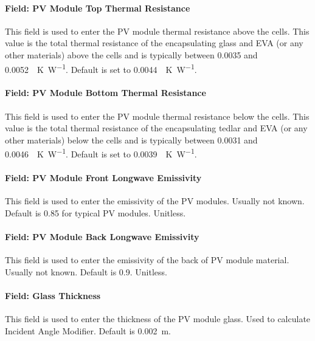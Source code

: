 \paragraph{Field: PV Module Top Thermal Resistance}\label{BIPVT-field-PVmodule-resistance-top}

This field is used to enter the PV module thermal resistance above the cells. This value is the total thermal resistance of the encapsulating glass and EVA (or any other materials) above the cells and is typically between 0.0035 and \SI{0.0052}{\area\K\per\watt}. Default is set to \SI{0.0044}{\area\K\per\watt}.


\paragraph{Field: PV Module Bottom Thermal Resistance}\label{BIPVT-field-PVmodule-resistance-bottom}

This field is used to enter the PV module thermal resistance below the cells. This value is the total thermal resistance of the encapsulating tedlar and EVA (or any other materials) below the cells and is typically between 0.0031 and \SI{0.0046}{\area\K\per\watt}. Default is set to \SI{0.0039}{\area\K\per\watt}.

\paragraph{Field: PV Module Front Longwave Emissivity}\label{BIPVT-field-PVmodule-emissivity}

This field is used to enter the emissivity of the PV modules. Usually not known. Default is 0.85 for typical PV modules. Unitless.

\paragraph{Field: PV Module Back Longwave Emissivity}\label{BIPVT-field-moduleBack-emissivity}

This field is used to enter the emissivity of the back of PV module material. Usually not known. Default is 0.9. Unitless.

\paragraph{Field: Glass Thickness}\label{BIPVT-field-PVglass-thickness}

This field is used to enter the thickness of the PV module glass. Used to calculate Incident Angle Modifier. Default is \SI{0.002}{\m}.

